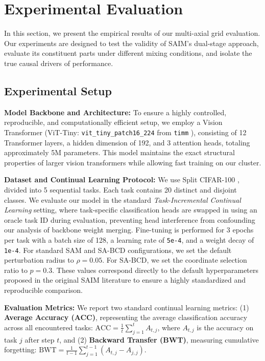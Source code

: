 \section{Experimental Evaluation}
\label{sec:experiments}

In this section, we present the empirical results of our multi-axial grid evaluation. Our experiments are designed to test the validity of SAIM's dual-stage approach, evaluate its constituent parts under different mixing conditions, and isolate the true causal drivers of performance.

\subsection{Experimental Setup}
\textbf{Model Backbone and Architecture:} To ensure a highly controlled, reproducible, and computationally efficient setup, we employ a Vision Transformer (ViT-Tiny: \texttt{vit\_tiny\_patch16\_224} from \texttt{timm} \cite{timm}), consisting of 12 Transformer layers, a hidden dimension of 192, and 3 attention heads, totaling approximately 5M parameters. This model maintains the exact structural properties of larger vision transformers while allowing fast training on our cluster.

\textbf{Dataset and Continual Learning Protocol:} We use Split CIFAR-100 \cite{cifar100}, divided into 5 sequential tasks. Each task contains 20 distinct and disjoint classes. We evaluate our model in the standard \emph{Task-Incremental Continual Learning} setting, where task-specific classification heads are swapped in using an oracle task ID during evaluation, preventing head interference from confounding our analysis of backbone weight merging. Fine-tuning is performed for 3 epochs per task with a batch size of 128, a learning rate of \texttt{5e-4}, and a weight decay of \texttt{1e-4}. For standard SAM and SA-BCD configurations, we set the default perturbation radius to $\rho = 0.05$. For SA-BCD, we set the coordinate selection ratio to $p = 0.3$. These values correspond directly to the default hyperparameters proposed in the original SAIM literature to ensure a highly standardized and reproducible comparison.

\textbf{Evaluation Metrics:} We report two standard continual learning metrics: (1) \textbf{Average Accuracy (ACC)}, representing the average classification accuracy across all encountered tasks: $\text{ACC} = \frac{1}{t} \sum_{j=1}^t A_{t, j}$, where $A_{t, j}$ is the accuracy on task $j$ after step $t$, and (2) \textbf{Backward Transfer (BWT)}, measuring cumulative forgetting: $\text{BWT} = \frac{1}{t-1} \sum_{j=1}^{t-1} (A_{t, j} - A_{j, j})$.

